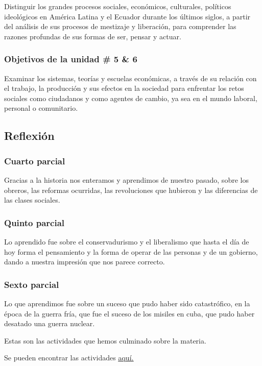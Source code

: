 \documentclass[a4paper, 12pt]{article}
\begin{document}
Distinguir los grandes procesos sociales, económicos, culturales, políticos
ideológicos en América Latina y el Ecuador durante los últimos siglos, a partir del análisis de sus procesos de mestizaje y liberación, para comprender las razones profundas de sus formas de ser, pensar y actuar.

\subsubsection{Objetivos de la unidad \# 5 \& 6}

Examinar los sistemas, teorías y escuelas económicas, a través de su relación con el trabajo, la producción y sus efectos en la sociedad para enfrentar los retos sociales como ciudadanos y como agentes de cambio, ya sea en el mundo laboral, personal o comunitario.

\subsection{Reflexión}

\subsubsection{Cuarto parcial}
Gracias a la historia nos enteramos y aprendimos de nuestro pasado, sobre los obreros, las reformas ocurridas, las revoluciones que hubieron y las diferencias de las clases sociales.

\subsubsection{Quinto parcial}
Lo aprendido fue sobre el conservadurismo y el liberalismo que hasta el día de hoy forma el pensamiento y la forma de operar de las personas y de un gobierno, dando a nuestra impresión que nos parece correcto.

\subsubsection{Sexto parcial}
Lo que aprendimos fue sobre un suceso que pudo haber sido catastrófico, en la época de la guerra fría, que fue el suceso de los misiles en cuba, que pudo haber desatado una guerra nuclear.

Estas son las actividades que hemos culminado sobre la materia.

Se pueden encontrar las actividades \href{https://drive.google.com/drive/folders/1J-HMvcP6JzfQoPtuu-0Y0o9HO8xSQonl?usp=sharing}{\underline{aquí.}}
\end{document}
